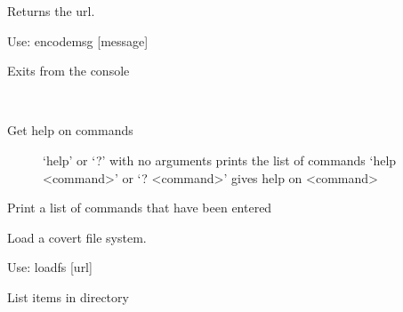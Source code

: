 \documentclass[letterpaper,12pt,openany,oneside]{sphinxmanual}
\begin{document}
\begin{fulllineitems}
\begin{fulllineitems}
Returns the url.

Use: encodemsg {[}message{]}

\end{fulllineitems}


\begin{fulllineitems}
\label{console:covertFS.console.Console.do_exit}
Exits from the console

\end{fulllineitems}


\begin{fulllineitems}
\label{console:covertFS.console.Console.do_help}~\begin{description}
\item[{Get help on commands}] \leavevmode
`help' or `?' with no arguments prints the list of commands
`help \textless{}command\textgreater{}' or `? \textless{}command\textgreater{}' gives help on \textless{}command\textgreater{}

\end{description}

\end{fulllineitems}


\begin{fulllineitems}
\label{console:covertFS.console.Console.do_hist}
Print a list of commands that have been entered

\end{fulllineitems}


\begin{fulllineitems}
\label{console:covertFS.console.Console.do_loadfs}
Load a covert file system.

Use: loadfs {[}url{]}

\end{fulllineitems}


\begin{fulllineitems}
\label{console:covertFS.console.Console.do_ls}
List items in directory


\end{fulllineitems}
\end{fulllineitems}
\end{document}
